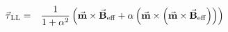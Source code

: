 \documentclass[12pt]{article}
\newcommand{\vc}[1]{\ensuremath{\vec{\textbf{#1}}}}
\newcommand{\m}{\vc{m}}
\newcommand{\B}[1]{\vc{B}_\mathrm{#1}}
\newcommand{\Beff}{\B{eff}}
\newcommand{\tq}[1]{\vc{\ensuremath{\tau}}\ensuremath{_\mathrm{#1}}}
\newcommand{\damp}{\ensuremath{\alpha}}
\begin{document}
\pagestyle{empty}

\begin{eqnarray*}
	\tq{LL} &=& \frac{1}{1+\damp^2} \left(  \m \times \Beff  +\damp\left( \m \times \left( \m \times \Beff \right)\right)   \right)
\end{eqnarray*}
\end{document}
